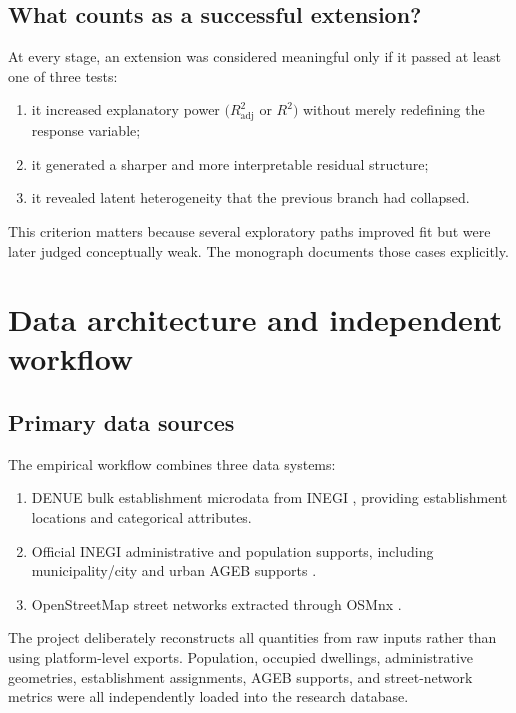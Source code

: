 \documentclass[11pt]{article}
\newcommand{\adjR}{R^2_{\mathrm{adj}}}
\begin{document}
\subsection{What counts as a successful extension?}

At every stage, an extension was considered meaningful only if it passed at least one of three tests:
\begin{enumerate}[label=(\alph*),leftmargin=2.0em]
\item it increased explanatory power \((\adjR\) or \(R^2)\) without merely redefining the response variable;
\item it generated a sharper and more interpretable residual structure;
\item it revealed latent heterogeneity that the previous branch had collapsed.
\end{enumerate}

This criterion matters because several exploratory paths improved fit but were later judged conceptually weak. The monograph documents those cases explicitly.

\section{Data architecture and independent workflow}

\subsection{Primary data sources}

The empirical workflow combines three data systems:
\begin{enumerate}[label=\arabic*.,leftmargin=2.0em]
\item DENUE bulk establishment microdata from INEGI \citep{denue}, providing establishment locations and categorical attributes.
\item Official INEGI administrative and population supports, including municipality/city and urban AGEB supports \citep{inegi_catalogo}.
\item OpenStreetMap street networks extracted through OSMnx \citep{boeing2017osmnx,openstreetmap}.
\end{enumerate}

The project deliberately reconstructs all quantities from raw inputs rather than using platform-level exports. Population, occupied dwellings, administrative geometries, establishment assignments, AGEB supports, and street-network metrics were all independently loaded into the research database.
\end{document}
